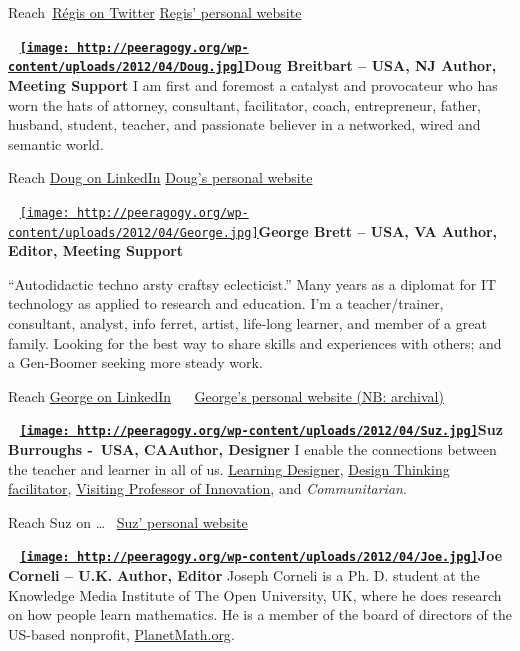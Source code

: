 Reach~\href{https://twitter.com/regisbarondeau}{Régis on Twitter}
\textbar{} \href{http://www.regisbarondeau.com}{Regis' personal website}

~
\textbf{\href{http://peeragogy.org/wp-content/uploads/2012/04/Doug.jpg}{\texttt{[image: http://peeragogy.org/wp-content/uploads/2012/04/Doug.jpg]}}Doug
Breitbart -- USA, NJ Author, Meeting Support} I am first and foremost a
catalyst and provocateur who has worn the hats of attorney, consultant,
facilitator, coach, entrepreneur, father, husband, student, teacher, and
passionate believer in a networked, wired and semantic world.

Reach
\href{http://www.linkedin.com/profile/view?id=791427\&trk=tab_pro}{Doug
on LinkedIn} \textbar{} \href{www.ontologique.com}{Doug's personal
website}

~
\href{http://peeragogy.org/resources/meet-the-team/george/}{\texttt{[image: http://peeragogy.org/wp-content/uploads/2012/04/George.jpg]}}\textbf{George
Brett -- USA, VA Author, Editor, Meeting Support}

``Autodidactic techno arsty craftsy eclecticist.'' Many years as a
diplomat for IT technology as applied to research and education. I'm a
teacher/trainer, consultant, analyst, info ferret, artist, life-long
learner, and member of a great family. Looking for the best way to share
skills and experiences with others; and a Gen-Boomer seeking more steady
work.

Reach \href{http://www.linkedin.com/in/ghbrett/}{George on LinkedIn}
~\textbar{} ~\href{http://ghbrett.org}{George's personal website (NB:
archival)}

~
\textbf{\href{http://peeragogy.org/wp-content/uploads/2012/04/Suz.jpg}{\texttt{[image: http://peeragogy.org/wp-content/uploads/2012/04/Suz.jpg]}}Suz
Burroughs -~USA, CA}\textbf{Author, Designer} I enable the connections
between the teacher and learner in all of us.
\href{http://www.learningsolutionsmag.com/articles/795/behavior-centered-design-at-google-a-case-study}{Learning
Designer},
\href{http://googleblog.blogspot.com/2012/12/unleashing-creativity-in-googles-csilab.html}{Design
Thinking facilitator},
\href{http://www.stmarytx.edu/news/top-stories/index.php?headline=Design_Thinking_Now_a_Part_of_MBA_Program}{Visiting
Professor of Innovation}, and \emph{Communitarian}.

Reach Suz on \ldots{} \textbar{}
~\href{http://susanburroughs.squarespace.com/}{Suz' personal website}

~
\textbf{\href{http://peeragogy.org/wp-content/uploads/2012/04/Joe.jpg}{\texttt{[image: http://peeragogy.org/wp-content/uploads/2012/04/Joe.jpg]}}Joe
Corneli -- U.K.} \textbf{Author, Editor} Joseph Corneli is a Ph. D.
student at the Knowledge Media Institute of The Open University, UK,
where he does research on how people learn mathematics. He is a member
of the board of directors of the US-based nonprofit,
\href{planetmath.org}{PlanetMath.org}.

